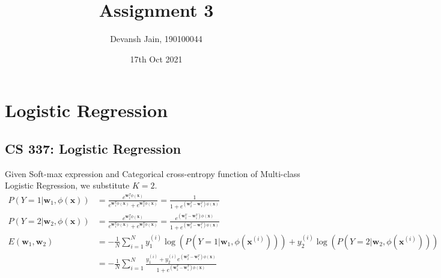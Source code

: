 \documentclass[12pt, fleqn]{article}
\title{Assignment 3}
\author{Devansh Jain, 190100044}
\date{17th Oct 2021}
\begin{document}
\maketitle
\tableofcontents
\thispagestyle{empty}
\setcounter{page}{0}

\newpage

\section{Logistic Regression}
\subsection{CS 337: Logistic Regression}

Given Soft-max expression and Categorical cross-entropy function of Multi-class Logistic Regression, we substitute $K = 2$.
\begin{equation*}
  \begin{aligned}
    P(Y = 1| \mathbf{w}_1, \phi(\mathbf{x})) & = \frac{e^{\mathbf{w}_1^T \phi(\mathbf{x})}}{e^{\mathbf{w}_1^T \phi(\mathbf{x})} + e^{\mathbf{w}_2^T \phi(\mathbf{x})}} = \frac{1}{1 + e^{(\mathbf{w}_2^T - \mathbf{w}_1^T) \phi(\mathbf{x})}}                                                      \\
    P(Y = 2| \mathbf{w}_2, \phi(\mathbf{x})) & = \frac{e^{\mathbf{w}_2^T \phi(\mathbf{x})}}{e^{\mathbf{w}_1^T \phi(\mathbf{x})} + e^{\mathbf{w}_2^T \phi(\mathbf{x})}} = \frac{e^{(\mathbf{w}_2^T - \mathbf{w}_1^T) \phi(\mathbf{x})}}{1 + e^{(\mathbf{w}_2^T - \mathbf{w}_1^T) \phi(\mathbf{x})}} \\
    E(\mathbf{w}_1, \mathbf{w}_2)            & = - \frac{1}{N} \sum_{i=1}^N y_1^{(i)} \log (P(Y = 1| \mathbf{w}_1, \phi(\mathbf{x}^{(i)}))) + y_2^{(i)} \log (P(Y = 2| \mathbf{w}_2, \phi(\mathbf{x}^{(i)})))                                                                                      \\
                                             & = - \frac{1}{N} \sum_{i=1}^N \frac{y_1^{(i)} + y_2^{(i)} e^{(\mathbf{w}_2^T - \mathbf{w}_1^T) \phi(\mathbf{x})}}{1 + e^{(\mathbf{w}_2^T - \mathbf{w}_1^T) \phi(\mathbf{x})}}                                                                        \\
  \end{aligned}
\end{equation*}
\end{document}
